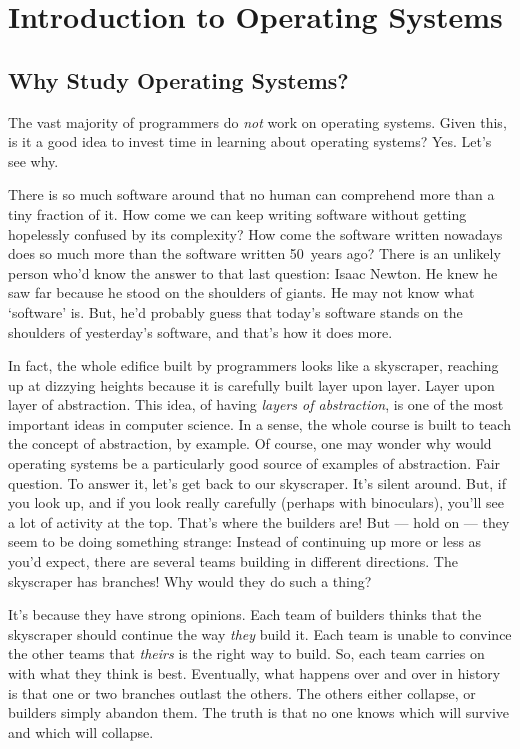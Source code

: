\chapter{Introduction to Operating Systems}\label{ch:00-introduction}

\section{Why Study Operating Systems?}

The vast majority of programmers do \emph{not} work on operating systems.
Given this, is it a good idea to invest time in learning about operating systems?
Yes.
Let's see why.

There is so much software around that no human can comprehend more than a tiny fraction of it.
How come we can keep writing software without getting hopelessly confused by its complexity?
How come the software written nowadays does so much more than the software written 50~years ago?
There is an unlikely person who'd know the answer to that last question:
  Isaac Newton.
He knew he saw far because he stood on the shoulders of giants.
He may not know what `software' is.
But, he'd probably guess that today's software stands on the shoulders of yesterday's software,
  and that's how it does more.

In fact, the whole edifice built by programmers looks like a skyscraper,
  reaching up at dizzying heights because it is carefully built layer upon layer.
Layer upon layer of abstraction.
This idea, of having \emph{layers of abstraction},
  is one of the most important ideas in computer science.
In a sense,
  the whole course is built to teach the concept of abstraction,
  by example.
Of course,
  one may wonder why would operating systems be a particularly good source of examples of abstraction.
Fair question.
To answer it, let's get back to our skyscraper.
It's silent around.
But, if you look up, and if you look really carefully (perhaps with binoculars),
  you'll see a lot of activity at the top.
That's where the builders are!
But --- hold on --- they seem to be doing something strange:
  Instead of continuing up more or less as you'd expect,
  there are several teams building in different directions.
The skyscraper has branches!
Why would they do such a thing?

It's because they have strong opinions.
Each team of builders thinks that the skyscraper should continue the way \emph{they} build it.
Each team is unable to convince the other teams that \emph{theirs} is the right way to build.
So, each team carries on with what they think is best.
Eventually, what happens over and over in history is that one or two branches outlast the others.
The others either collapse, or builders simply abandon them.
The truth is that no one knows which will survive and which will collapse.

